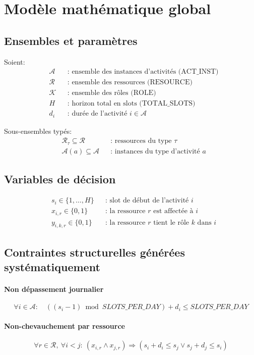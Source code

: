\documentclass[12pt,a4paper]{article}
\begin{document}
\section{Modèle mathématique global}
\subsection{Ensembles et paramètres}
Soient:
\begin{align*}
&\mathcal{A} &&\text{: ensemble des instances d'activités (ACT\_INST)} \\
&\mathcal{R} &&\text{: ensemble des ressources (RESOURCE)} \\
&\mathcal{K} &&\text{: ensemble des rôles (ROLE)} \\
&H &&\text{: horizon total en slots (TOTAL\_SLOTS)} \\
&d_i &&\text{: durée de l'activité } i \in \mathcal{A}
\end{align*}

Sous-ensembles typés:
\begin{align*}
&\mathcal{R}_\tau \subseteq \mathcal{R} &&\text{: ressources du type } \tau \\
&\mathcal{A}(a) \subseteq \mathcal{A} &&\text{: instances du type d'activité } a
\end{align*}

\subsection{Variables de décision}
\begin{align*}
&s_i \in \{1,\dots,H\} &&\text{: slot de début de l'activité } i \\
&x_{i,r}\in\{0,1\} &&\text{: la ressource } r \text{ est affectée à } i \\
&y_{i,k,r}\in\{0,1\} &&\text{: la ressource } r \text{ tient le rôle } k \text{ dans } i
\end{align*}

\subsection{Contraintes structurelles générées systématiquement}
\paragraph{Non dépassement journalier}
\[
\forall i\in\mathcal{A}:\quad ((s_i-1)\bmod SLOTS\_PER\_DAY)+d_i \le SLOTS\_PER\_DAY
\]

\paragraph{Non-chevauchement par ressource}
\[
\forall r\in\mathcal{R},\ \forall i<j:\ (x_{i,r}\land x_{j,r}) \Rightarrow (s_i+d_i\le s_j \lor s_j+d_j\le s_i)
\]
\end{document}
